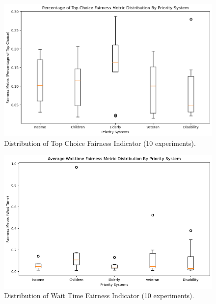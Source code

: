 \documentclass[11pt]{article}
\begin{document}
\begin{figure}[h!]
    \includegraphics[scale=0.5]{doc/FinalReport/top_choice_fairness.png}
    \caption{Distribution of Top Choice Fairness Indicator (10 experiments).}
    \label{fig:topchoicefairness}
\end{figure}

\begin{figure}[h!]
    \includegraphics[scale=0.5]{doc/FinalReport/waittime_fairness.png}
    \caption{Distribution of Wait Time Fairness Indicator (10 experiments).}
    \label{fig:waittimefairness}
\end{figure}
\end{document}
